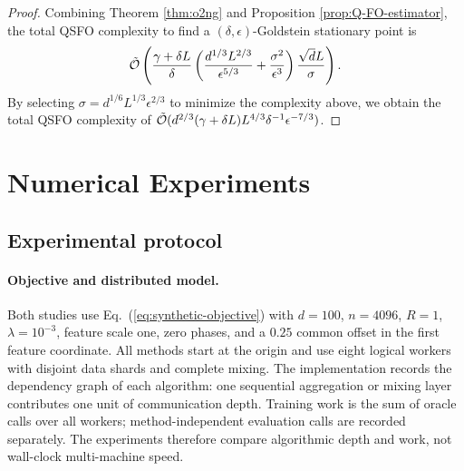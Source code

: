 \thmQFO*
\begin{proof}
	Combining Theorem \ref{thm:o2ng} and Proposition \ref{prop:Q-FO-estimator}, the total QSFO complexity to find a $(\delta,\epsilon)$-Goldstein stationary point is
	\begin{align*}
		\tilde {{\mathcal{O}}} \left( \frac{\gamma + \delta L}{\delta}  \left( \frac{ d^{1/3} L^{2/3}}{\epsilon^{5/3}} + \frac{\sigma^2}{\epsilon^3} \right) \frac{\sqrt{d}L}{\sigma}  \right).
	\end{align*}
	By selecting $\sigma= d^{1/6} L^{1/3} \epsilon^{2/3} $ to minimize the complexity above, we obtain the total QSFO complexity of $\tilde {{\mathcal{O}}}(d^{2/3}(\gamma + \delta L) L^{4/3} \delta^{-1} \epsilon^{-7/3})$.
\end{proof}


\section{Numerical Experiments}\label{app:numerical-experiments}

\subsection{Experimental protocol}\label{app:experiment-protocol}

\paragraph{Objective and distributed model.}
Both studies use Eq.~(\ref{eq:synthetic-objective}) with $d=100$, $n=4096$,
$R=1$, $\lambda=10^{-3}$, feature scale one, zero phases, and a $0.25$
common offset in the first feature coordinate.  All methods start at the
origin and use eight logical workers with disjoint data shards and complete
mixing.  The implementation records the dependency graph of each algorithm:
one sequential aggregation or mixing layer contributes one unit of
communication depth.  Training work is the sum of oracle calls over all
workers; method-independent evaluation calls are recorded separately.  The
experiments therefore compare algorithmic depth and work, not wall-clock
multi-machine speed.

